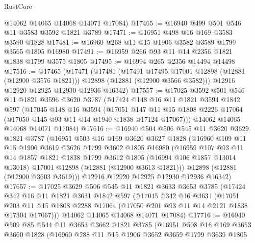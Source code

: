 \begin{lexlean}{RustCore}
\begin{coremodule}
      @14062
      @14065
      @14068
      @14071
      @17084)
@17465 := @16940 @499 @501 @546 @11 @3583 @3592 @1821 @3789
@17471 := @16951 @498 @16 @169 @3583 @3590 @1828
@17481 := @16960 @268 @11 @15 @1906 @3582 @3589 @1799 @3565 @1805 @16980
@17491 := @16959 @266 @93 @11 @14 @2356 @1821 @1838 @1799 @3575 @1805
@17495 := @16994 @265 @2356 @14494 @14498
@17516 := @17465
    (@17471
      (@17481
        (@17491 @17495 @17001 @12898 (@12881 (@12900 @3576 @1821)))
        @12898
        (@12881 (@12900 @3566 @3582)))
      @12916
      @12920
      @12925
      @12930
      @12936
      @16342)
@17557 := @17025
    @3592
    @501
    @546
    @11
    @1821
    @3596
    @3620
    @3787
    (@17424
      @148
      @16
      @11
      @1821
      @3594
      @1842
      @597
      (@17045
        @148
        @16
        @3594
        (@17051
          @147
          @11
          @15
          @1808
          @2226
          @17064
          (@17050 @145 @93 @11 @14 @1940 @1838 @17124 @17067)))
      @14062
      @14065
      @14068
      @14071
      @17084)
@17616 := @16940
    @504
    @506
    @545
    @11
    @3620
    @3629
    @1821
    @3787
    (@16951
      @503
      @16
      @169
      @3620
      @3627
      @1828
      (@16960
        @109
        @11
        @15
        @1906
        @3619
        @3626
        @1799
        @3602
        @1805
        @16980
        (@16959
          @107
          @93
          @11
          @14
          @1857
          @1821
          @1838
          @1799
          @3612
          @1805
          (@16994 @106 @1857 @13014 @13018)
          @17001
          @12898
          (@12881 (@12900 @3613 @1821)))
        @12898
        (@12881 (@12900 @3603 @3619)))
      @12916
      @12920
      @12925
      @12930
      @12936
      @16342)
@17657 := @17025
    @3629
    @506
    @545
    @11
    @1821
    @3633
    @3653
    @3785
    (@17424
      @342
      @16
      @11
      @1821
      @3631
      @1842
      @597
      (@17045
        @342
        @16
        @3631
        (@17051
          @203
          @11
          @15
          @1808
          @2288
          @17064
          (@17050 @201 @93 @11 @14 @2121 @1838 @17304 @17067)))
      @14062
      @14065
      @14068
      @14071
      @17084)
@17716 := @16940
    @509
    @85
    @544
    @11
    @3653
    @3662
    @1821
    @3785
    (@16951
      @508
      @16
      @169
      @3653
      @3660
      @1828
      (@16960
        @288
        @11
        @15
        @1906
        @3652
        @3659
        @1799
        @3639
        @1805

\end{coremodule}
\end{lexlean}
